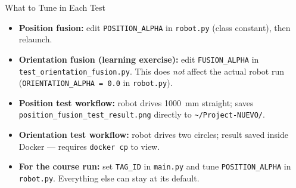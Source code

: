 \documentclass{beamer}
\begin{document}
\begin{frame}{What to Tune in Each Test}
    \begin{itemize}
        \item \textbf{Position fusion:} edit \texttt{POSITION\_ALPHA} in \texttt{robot.py} (class constant), then relaunch.
        \item \textbf{Orientation fusion (learning exercise):} edit \texttt{FUSION\_ALPHA} in \texttt{test\_orientation\_fusion.py}. This does \emph{not} affect the actual robot run (\texttt{ORIENTATION\_ALPHA = 0.0} in \texttt{robot.py}).
        \item \textbf{Position test workflow:} robot drives 1000~mm straight; saves \texttt{position\_fusion\_test\_result.png} directly to \texttt{\textasciitilde/Project-NUEVO/}.
        \item \textbf{Orientation test workflow:} robot drives two circles; result saved inside Docker --- requires \texttt{docker cp} to view.
        \item \textbf{For the course run:} set \texttt{TAG\_ID} in \texttt{main.py} and tune \texttt{POSITION\_ALPHA} in \texttt{robot.py}.  Everything else can stay at its default.
    \end{itemize}
\end{frame}
\end{document}
